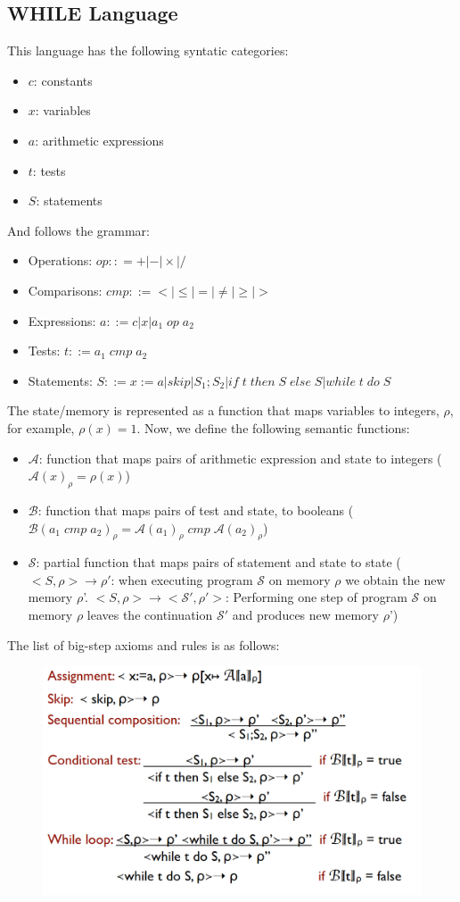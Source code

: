 \documentclass[10pt,a4paper]{report}
\begin{document}
\subsection{WHILE Language}
This language has the following syntatic categories:
\begin{itemize}
\item $c$: constants
\item $x$: variables
\item $a$: arithmetic expressions
\item $t$: tests
\item $S$: statements
\end{itemize}
And follows the grammar:
\begin{itemize}
\item Operations: $op:: = + | - | \times | /$
\item Comparisons: $cmp ::= < | \leq | = | \neq | \geq | >$
\item Expressions: $a::= c | x | a_1 \; op \; a_2$
\item Tests: $t ::= a_1 \; cmp \; a_2$
\item Statements: $S ::= x:=a | skip | S_1; S_2 | if \; t\; then \; S \; else \; S | while \; t \; do \; S$
\end{itemize}
The state/memory is represented as a function that maps variables to integers, $\rho$, for example, $\rho(x) = 1$. Now, we define the following semantic functions:
\begin{itemize}
\item $\mathcal{A}$: function that maps pairs of arithmetic expression and state to integers ($\mathcal{A}(x)_\rho = \rho(x)$)
\item $\mathcal{B}$: function that maps pairs of test and state, to booleans ($\mathcal{B}(a_1 \; cmp \; a_2)_\rho = \mathcal{A}(a_1)_\rho \; cmp \; \mathcal{A}(a_2)_\rho$)
\item $\mathcal{S}$: partial function that maps pairs of statement and state to state ($<S,\rho> \rightarrow \rho'$: when executing program $\mathcal{S}$ on memory $\rho$ we obtain the new memory $\rho$'. $<S,\rho> \rightarrow <\mathcal{S}', \rho'>$: Performing one step of program $\mathcal{S}$ on memory $\rho$ leaves the continuation $\mathcal{S}'$ and produces new memory $\rho$')
\end{itemize}
The list of big-step axioms and rules is as follows:
\begin{figure}[H]
\centering
\includegraphics[scale=0.4]{5.png}
\end{figure}
\end{document}
